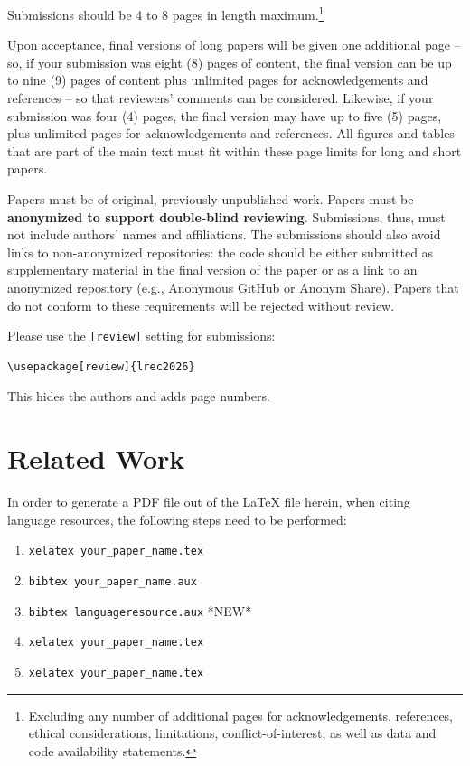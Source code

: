 \documentclass[10pt, a4paper]{article}
\begin{document}
Submissions should be 4 to 8 pages in length maximum.\footnote{Excluding any number of additional pages for acknowledgements, references, ethical considerations, limitations, conflict-of-interest, as well as data and code availability statements.}

Upon acceptance, final versions of long papers will be given one
additional page – so, if your submission was eight (8) pages of content, the final version can be up to nine (9) pages of content plus unlimited pages for acknowledgements and references – so that reviewers’ comments can be considered. Likewise, if your submission was four (4) pages, the final version may have up to five (5) pages, plus unlimited pages for acknowledgements and references. All figures and tables that are part of the main text must fit within these page limits for long and short papers.

Papers must be of original, previously-unpublished work. Papers must be \textbf{anonymized to support double-blind reviewing}. Submissions, thus, must not include authors’ names and affiliations. The submissions should also avoid links to non-anonymized repositories: the code should be either submitted as supplementary material in the final version of the paper or as a link to an anonymized repository (e.g., Anonymous GitHub or Anonym Share). Papers that do not conform to these requirements will be rejected without review.

Please use the \texttt{[review]} setting for submissions:

\begin{verbatim}
\usepackage[review]{lrec2026}
\end{verbatim}

This hides the authors and adds page numbers.

\section{Related Work}
\label{sec:append-how-prod}


In order to generate a PDF file out of the LaTeX file herein, when citing language resources, the following steps need to be performed:

\begin{enumerate}
\item \texttt{xelatex your\_paper\_name.tex}
\item \texttt{bibtex your\_paper\_name.aux}
\item \texttt{bibtex languageresource.aux}    *NEW*
\item \texttt{xelatex your\_paper\_name.tex}
\item \texttt{xelatex your\_paper\_name.tex}
\end{enumerate}
\end{document}
